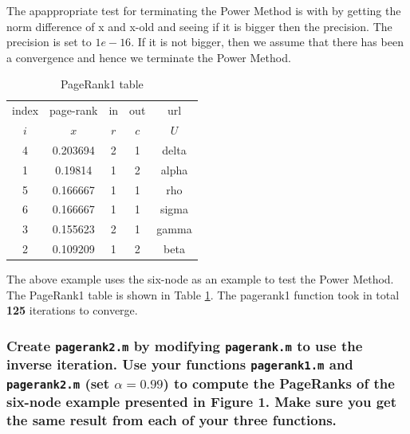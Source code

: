 \documentclass[unicode,11pt,a4paper,oneside,numbers=endperiod,openany]{scrartcl}
\begin{document}
The apappropriate test for terminating the Power Method is with by getting the norm difference of x and x-old and seeing if it is bigger then the precision. The precision is set to $ 1e-16 $. If it is not bigger, then we assume that there has been a convergence and hence we terminate the Power Method. \\

\begin{table}[h]
    \centering


    \begin{tabular}{|c|c|c|c|c|}
        \hline
        index & page-rank & in  & out & url   \\
        $i$   & $x$       & $r$ & $c$ & $U$   \\
        \hline
        4     & 0.203694  & 2   & 1   & delta \\
        1     & 0.19814   & 1   & 2   & alpha \\
        5     & 0.166667  & 1   & 1   & rho   \\
        6     & 0.166667  & 1   & 1   & sigma \\
        3     & 0.155623  & 2   & 1   & gamma \\
        2     & 0.109209  & 1   & 2   & beta  \\
        \hline
    \end{tabular}
    \caption{PageRank1 table}
    \label{tab:pagerank}
\end{table}

The above example uses the six-node as an example to test the Power Method. The PageRank1 table is shown in Table \ref{tab:pagerank}. The pagerank1 function took in total \textbf{125} iterations to converge.

\subsubsection{\texorpdfstring{Create \texttt{pagerank2.m} by modifying \texttt{pagerank.m} to use the inverse iteration. Use your functions \texttt{pagerank1.m} and \texttt{pagerank2.m} (set $\alpha = 0.99$) to compute the PageRanks of the six-node example presented in Figure 1. Make sure you get the same result from each of your three functions.}{Create pagerank2.m by modifying pagerank.m to use the inverse iteration. Use your functions pagerank1.m and pagerank2.m (set α = 0.99) to compute the PageRanks of the six-node example presented in Figure 1. Make sure you get the same result from each of your three functions.}}
\end{document}
